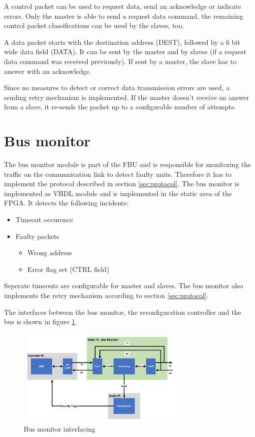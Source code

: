 A control packet can be used to request data, send an acknowledge or indicate errors. Only the master is able to send a request data command, the remaining control packet classifications can be used by the slaves, too.

A data packet starts with the destination address (DEST), followed by a 6 bit wide data field (DATA). It can be sent by the master and by slaves (if a request data command was received previously). If sent by a master, the slave has to answer with an acknowledge.

Since no measures to detect or correct data transmission errors are used, a sending retry mechanism is implemented. If the master doesn't receive an answer from a slave, it re-sends the packet up to a configurable number of attempts.

\section{Bus monitor}

The bus monitor module is part of the \gls{FBU} and is responsible for monitoring the traffic on the communication link to detect faulty units. Therefore it has to implement the protocol described in section \ref{sec:protocol}. 
The bus monitor is implemented as VHDL module and is implemented in the static area of the \gls{FPGA}. It detects the following incidents:

\begin{itemize}
    \item Timeout occurence
    \item Faulty packets
	\begin{itemize}
    		\item Wrong address
   		\item Error flag set (CTRL field)
	\end{itemize}
\end{itemize}

Seperate timeouts are configurable for master and slaves. The bus monitor also implements the retry mechanism according to section \ref{sec:protocol}.

The interfaces between the bus monitor, the reconfiguration controller and the bus is shown in figure \ref{fig:BusMonitor}.

\begin{figure}[h!]
    \centering
    \includegraphics[width=0.75\textwidth]{figures/BusMonitor.pdf}
    \caption{Bus monitor interfacing}\label{fig:BusMonitor}
\end{figure}

